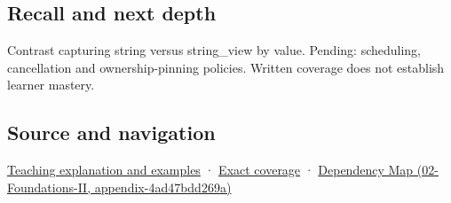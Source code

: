 \subsection{Recall and next depth}\label{recall-and-next-depth}

Contrast capturing string versus string\_view by value. Pending: scheduling, cancellation and ownership-pinning policies. Written coverage does not establish learner mastery.

\subsection{Source and navigation}\label{source-and-navigation}

\href{Continuous\%20Notes/Computing\%20Foundations\%20-\%20From\%20Bits\%20to\%20C++\%20and\%20Systems\%20APIs\#Borrowed\%20views\%20and\%20deferred\%20work\%20need\%20an\%20owner\%20story}{Teaching explanation and examples} · \hyperref[appendix-fd090d982a15]{Exact coverage} · \href{}{Dependency Map (02-Foundations-II, appendix-4ad47bdd269a)}
